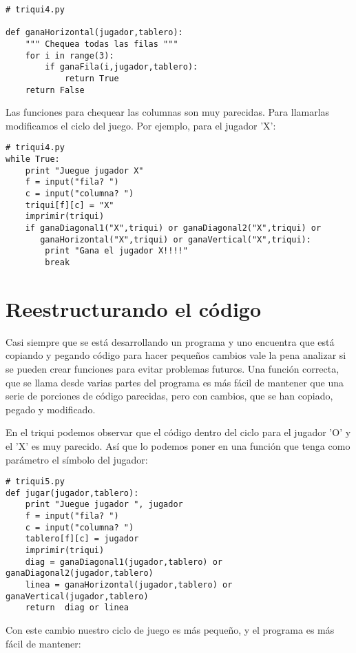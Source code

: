 \beforeverb
\begin{verbatim}
# triqui4.py

def ganaHorizontal(jugador,tablero):
    """ Chequea todas las filas """
    for i in range(3):
        if ganaFila(i,jugador,tablero):
            return True
    return False
\end{verbatim}
\afterverb

Las funciones para chequear las columnas son muy parecidas. Para llamarlas  
modificamos el ciclo del juego. Por ejemplo, para el jugador 'X':

\beforeverb
\begin{verbatim}
# triqui4.py
while True:
    print "Juegue jugador X"
    f = input("fila? ")
    c = input("columna? ")
    triqui[f][c] = "X"
    imprimir(triqui)
    if ganaDiagonal1("X",triqui) or ganaDiagonal2("X",triqui) or 
       ganaHorizontal("X",triqui) or ganaVertical("X",triqui):
        print "Gana el jugador X!!!!"
        break
\end{verbatim}
\afterverb

\section{Reestructurando el código}

Casi siempre que se está desarrollando un programa y uno encuentra que está copiando y
pegando código para hacer pequeños cambios vale la pena analizar si se pueden crear
funciones para evitar problemas futuros. Una función correcta, que se llama desde
varias partes del programa es más fácil de mantener que una serie de porciones de 
código parecidas, pero con cambios, que se han copiado, pegado y modificado.

En el triqui podemos observar que el código dentro del ciclo para el jugador 'O' 
y el 'X' es muy parecido. Así que  lo podemos poner en una
función que tenga como parámetro el símbolo del jugador:

\beforeverb
\begin{verbatim}
# triqui5.py
def jugar(jugador,tablero):
    print "Juegue jugador ", jugador
    f = input("fila? ")
    c = input("columna? ")
    tablero[f][c] = jugador
    imprimir(triqui)
    diag = ganaDiagonal1(jugador,tablero) or ganaDiagonal2(jugador,tablero)
    linea = ganaHorizontal(jugador,tablero) or ganaVertical(jugador,tablero)
    return  diag or linea
\end{verbatim}
\afterverb

Con este cambio nuestro ciclo de juego es más pequeño, y el programa es más
fácil de mantener:

